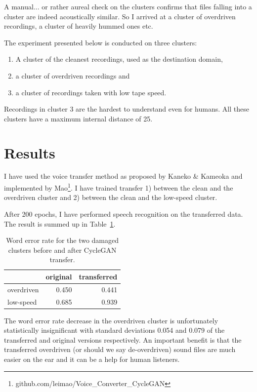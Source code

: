 \documentclass[12pt,a4paper]{report}
\begin{document}
A manual... or rather aureal check on the clusters confirms that files falling
into a cluster are indeed acoustically similar. So I arrived at a cluster of
overdriven recordings, a cluster of heavily hummed ones etc.

The experiment presented below is conducted on three clusters:
\begin{enumerate}
\item{A cluster of the cleanest recordings, used as the destination domain,}
\item{a cluster of overdriven recordings and}
\item{a cluster of recordings taken with low tape speed.}
\end{enumerate}
Recordings in cluster 3 are the hardest to understand even for humans. All these
clusters have a maximum internal distance of 25.

\section{Results}

I have used the voice transfer method as proposed by Kaneko \&
Kameoka\cite{kaneko2017parallel} and implemented by
Mao\footnote{github.com/leimao/Voice\_Converter\_CycleGAN}. I have trained
transfer 1) between the clean and the overdriven cluster and 2) between the
clean and the low-speed cluster.

After 200 epochs, I have performed speech recognition on the transferred data.
The result is summed up in Table~\ref{tab:results}.

\begin{table}[htpb]
\caption{Word error rate for the two damaged clusters before and after CycleGAN
transfer.}\label{tab:results}
\centering
\begin{tabular}{|l||r|r|}
\hline
           & original & transferred \\
\hline
overdriven & 0.450 & 0.441 \\
low-speed  & 0.685 & 0.939 \\
\hline
\end{tabular}
\end{table}

The word error rate decrease in the overdriven cluster is unfortunately statistically
insignificant with standard deviations 0.054 and 0.079 of the transferred and
original versions respectively. An important benefit is
that the transferred overdriven (or should we say de-overdriven) sound files are
much easier on the ear and it can be a help for human listeners.
\end{document}

